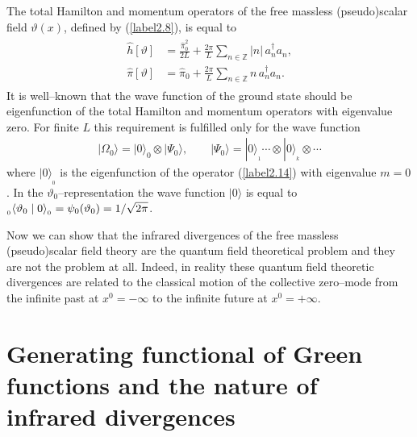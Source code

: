 \documentclass[a4paper,12pt] {article}
\begin{document}
The total Hamilton and momentum operators of the free
massless (pseudo)scalar field $\vartheta(x)$, defined by
(\ref{label2.8}), is equal to
%
\begin{eqnarray}\label{label2.20}
\begin{aligned}
\hat{h}[\vartheta] &= \frac{\hat{\pi}^2_0}{2L} + \frac{2\pi}{L}\sum_{n
\in \mathbb{Z}}|n|\,a^{\dagger}_n a_n,\\ \hat{\pi}[\vartheta] &=
\hat{\pi}_0 + \frac{2\pi}{L}\sum_{n \in \mathbb{Z}}n\,a^{\dagger}_n
a_n.
\end{aligned}
\end{eqnarray}
%
It is well--known that the wave function of the ground state should be
eigenfunction of the total Hamilton and momentum operators with
eigenvalue zero. For finite $L$ this requirement is fulfilled only for
the wave function
%
\begin{eqnarray}\label{label2.21}
|\Omega_0\rangle = |0\rangle_0 \otimes |\Psi_0\rangle,\qquad |\Psi_0\rangle=|0\rangle_{_1} \cdots \otimes |0 \rangle_{_k} \otimes \cdots
\end{eqnarray}
%
where $|0\rangle_{_0}$ is the eigenfunction of the operator
(\ref{label2.14}) with eigenvalue $m = 0$. In the
$\vartheta_0$--representation the wave function $|0\rangle$ is equal
to $\vspace{1mm}_{_0}\vspace{-1mm}\langle \vartheta_0 \mid 0
\rangle_{_0} = \psi_0(\vartheta_0) = 1/\sqrt{2\pi}$.

Now we can show that the infrared divergences of the free massless
(pseudo)scalar field theory are the quantum field theoretical problem
and they are not the problem at all. Indeed, in reality these quantum
field theoretic divergences are related to the classical motion of the
collective zero--mode from the infinite past at $x^0 = - \infty$ to the
infinite future at $x^0 = + \infty$.

\section{Generating functional of Green functions and the nature of 
infrared divergences }\label{SecGenFunct}
\setcounter{equation}{0}
\end{document}
